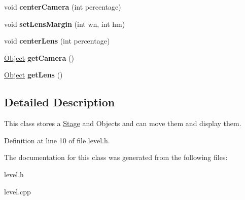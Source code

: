 \begin{DoxyCompactItemize}
\item 
void {\bfseries center\+Camera} (int percentage)\hypertarget{classLevel_ae2df583cad2a4bbda86e4043d4b81a70}{}\label{classLevel_ae2df583cad2a4bbda86e4043d4b81a70}

\item 
void {\bfseries set\+Lens\+Margin} (int wn, int hm)\hypertarget{classLevel_a72667cfc3b4e98433f4faac78e30e83e}{}\label{classLevel_a72667cfc3b4e98433f4faac78e30e83e}

\item 
void {\bfseries center\+Lens} (int percentage)\hypertarget{classLevel_ac39dbca241ee739f5f9c2a750c3750f4}{}\label{classLevel_ac39dbca241ee739f5f9c2a750c3750f4}

\item 
\hyperlink{classObject}{Object} {\bfseries get\+Camera} ()\hypertarget{classLevel_a11a17dbe04938950421d001a8f94cbbc}{}\label{classLevel_a11a17dbe04938950421d001a8f94cbbc}

\item 
\hyperlink{classObject}{Object} {\bfseries get\+Lens} ()\hypertarget{classLevel_a33bd74850ef322de8d76572f9fea312f}{}\label{classLevel_a33bd74850ef322de8d76572f9fea312f}

\end{DoxyCompactItemize}


\subsection{Detailed Description}
This class stores a \hyperlink{classStage}{Stage} and Objects and can move them and display them. 

Definition at line 10 of file level.\+h.



The documentation for this class was generated from the following files\+:\begin{DoxyCompactItemize}
\item 
level.\+h\item 
level.\+cpp\end{DoxyCompactItemize}
